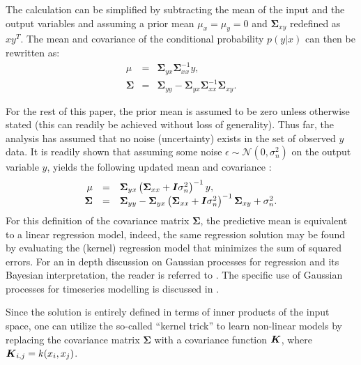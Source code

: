 \documentclass[useAMS,usenatbib,fleqn]{mn2e}
\begin{document}
The calculation can be simplified by subtracting the mean of the input and the output variables and assuming a prior mean $\mu_{x}=\mu_{y}=0$ and $\mathbf\Sigma_{xy}$ redefined as $xy^{T}$. The mean and covariance of the conditional probability $p(y|x)$ can then be rewritten as:
\begin{equation}
\label{eq-conditional-zero-mean}
\begin{array}{rcl}
\mu 		&=&		\mathbf\Sigma_{yx}\mathbf\Sigma_{xx}^{-1}y,\\
\mathbf\Sigma 	&=& 	\mathbf\Sigma_{yy}-\mathbf\Sigma_{yx}\mathbf\Sigma_{xx}^{-1}\mathbf\Sigma_{xy}.
\end{array}
\end{equation}

For the rest of this paper, the prior mean is assumed to be zero unless otherwise stated (this can readily be achieved without loss of generality). Thus far, the analysis has assumed that no noise (uncertainty) exists in the set of observed $y$ data. It is readily shown that assuming some noise $\epsilon \sim \mathcal{N}\left(0,\sigma_{n}^{2}\right)$ on the output variable $y$, yields the following updated mean and covariance \citep{rasmussen2006gaussian}:
\begin{equation}
\label{eq-mean-variance-noise}
\begin{array}{rcl}
\mu &=& \mathbf\Sigma_{yx}\left(\mathbf\Sigma_{xx}+\bmath{I}\sigma_{n}^{2}\right)^{-1}y,\\
\mathbf\Sigma &=& \mathbf\Sigma_{yy}-\mathbf\Sigma_{yx}\left(\mathbf\Sigma_{xx}+\bmath{I}\sigma_{n}^{2}\right)^{-1}\mathbf\Sigma_{xy}+\sigma_{n}^{2}.
\end{array}
\end{equation}
For this definition of the covariance matrix $\mathbf\Sigma$, the predictive mean is equivalent to a linear regression model, indeed, the same regression solution may be found by evaluating the (kernel) regression model that minimizes the sum of squared errors. For an in depth discussion on Gaussian processes for regression and its Bayesian interpretation, the reader is referred to \citep{rasmussen2006gaussian}. The specific use of Gaussian processes for timeseries modelling is discussed in \citep{roberts2012rs}.

Since the solution is entirely defined in terms of inner products of the input space, one can utilize the so-called ``kernel trick'' to learn non-linear models by replacing the covariance matrix $\mathbf\Sigma$ with a covariance function $\bmath{K}$, where $\bmath{K}_{i,j} = k(x_{i},x_{j})$.
\end{document}
